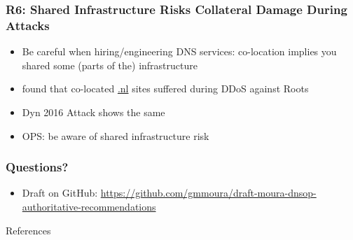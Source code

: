 \documentclass[11pt,show 
notes,notheorems,noamsthm,blank]{beamer} %
\begin{document}
\begin{frame}
 \frametitle{R6:  Shared Infrastructure Risks Collateral Damage During 
Attacks}
 \begin{itemize}
  \item Be careful when hiring/engineering DNS services: co-location implies 
you shared some (parts of the) infrastructure

\item \cite{Moura16b} found that co-located \url{.nl} sites suffered during 
DDoS against Roots
\item Dyn 2016 Attack shows the same

\item OPS: be aware of shared infrastructure risk
 \end{itemize}

\end{frame}



\begin{frame}
 \frametitle{Questions?}
 
 
 \begin{itemize}
  \item Draft on GitHub: \small
\url{https://github.com/gmmoura/draft-moura-dnsop-authoritative-recommendations}
 \end{itemize}

\end{frame}
 
 \begin{frame}[allowframebreaks] {References}
 

\small

\end{frame}
 
\end{document}
